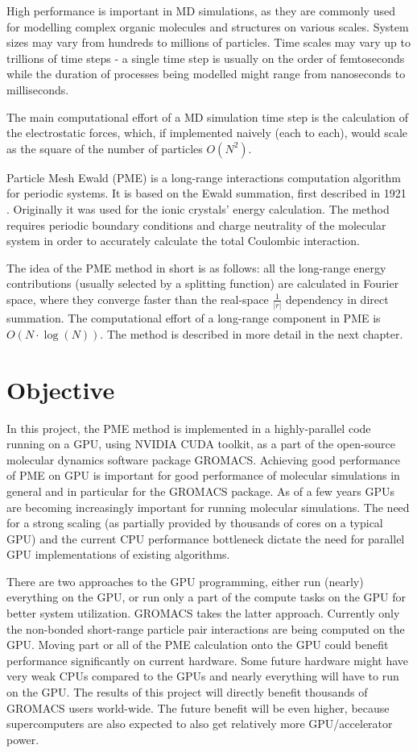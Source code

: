 \documentclass[12pt,a4paper,notitlepage]{report}
\begin{document}
High performance is important in MD simulations, as they are commonly used for modelling complex organic molecules and structures on various scales. System sizes may vary from hundreds to millions of particles. Time scales may vary up to trillions of time steps - a single time step is usually on the order of femtoseconds while the duration of processes being modelled might range from nanoseconds to milliseconds.

The main computational effort of a MD simulation time step is the calculation of the electrostatic forces, which, if implemented naively (each to each), would scale as the square of the number of particles $O(N^2)$.

Particle Mesh Ewald (PME) is a long-range interactions computation algorithm for periodic systems. It is based on the Ewald summation, first described in 1921 \cite{ewald}. Originally it was used for the ionic crystals' energy calculation. The method requires periodic boundary conditions and charge neutrality of the molecular system in order to accurately calculate the total Coulombic interaction. 

The idea of the PME method in short is as follows: all the long-range energy contributions (usually selected by a splitting function) are calculated in Fourier space, where they converge faster than the real-space $\frac{1}{\lvert r\rvert}$ dependency in direct summation. The computational effort of a long-range component in PME is $ O(N\cdot\log(N))$. The method is described in more detail in the next chapter.
 
\section{Objective} 
 
In this project, the PME method is implemented in a highly-parallel code running on a GPU, using NVIDIA CUDA toolkit, as a part of the open-source molecular dynamics software package GROMACS. 
Achieving good performance of PME on GPU is important for good performance of molecular simulations in general and in particular for the GROMACS package. As of a few years GPUs are becoming increasingly important for running molecular simulations. The need for a strong scaling (as partially provided by thousands of cores on a typical GPU) and the current CPU performance bottleneck dictate the need for parallel GPU implementations of existing algorithms.

There are two approaches to the GPU programming, either run (nearly) everything on the GPU, or run only a part of the compute tasks on the GPU for better system utilization. GROMACS takes the latter approach. Currently only the non-bonded short-range particle pair interactions are being computed on the GPU. Moving part or all of the PME calculation onto the GPU could benefit performance significantly on current hardware. Some future hardware might have very weak CPUs compared to the GPUs and nearly everything will have to run on the GPU. The results of this project will directly benefit thousands of GROMACS users world-wide. The future benefit will be even higher, because supercomputers are also expected to also get relatively more GPU/accelerator power.
\end{document}
